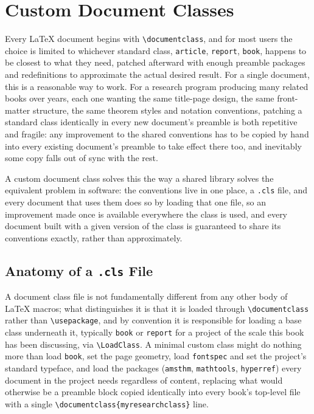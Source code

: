 \hypertarget{chapter-16-custom-document-classes}{%
\chapter{Custom Document Classes}\label{chapter-16-custom-document-classes}}

Every LaTeX document begins with \texttt{\textbackslash{}documentclass}, and for most users the choice is limited to whichever standard class, \texttt{article}, \texttt{report}, \texttt{book}, happens to be closest to what they need, patched afterward with enough preamble packages and redefinitions to approximate the actual desired result. For a single document, this is a reasonable way to work. For a research program producing many related books over years, each one wanting the same title-page design, the same front-matter structure, the same theorem styles and notation conventions, patching a standard class identically in every new document's preamble is both repetitive and fragile: any improvement to the shared conventions has to be copied by hand into every existing document's preamble to take effect there too, and inevitably some copy falls out of sync with the rest.

A custom document class solves this the way a shared library solves the equivalent problem in software: the conventions live in one place, a \texttt{.cls} file, and every document that uses them does so by loading that one file, so an improvement made once is available everywhere the class is used, and every document built with a given version of the class is guaranteed to share its conventions exactly, rather than approximately.

\hypertarget{anatomy-of-a-.cls-file}{%
\section{\texorpdfstring{Anatomy of a \texttt{.cls} File}{Anatomy of a .cls File}}\label{anatomy-of-a-.cls-file}}

A document class file is not fundamentally different from any other body of LaTeX macros; what distinguishes it is that it is loaded through \texttt{\textbackslash{}documentclass} rather than \texttt{\textbackslash{}usepackage}, and by convention it is responsible for loading a base class underneath it, typically \texttt{book} or \texttt{report} for a project of the scale this book has been discussing, via \texttt{\textbackslash{}LoadClass}. A minimal custom class might do nothing more than load \texttt{book}, set the page geometry, load \texttt{fontspec} and set the project's standard typeface, and load the packages (\texttt{amsthm}, \texttt{mathtools}, \texttt{hyperref}) every document in the project needs regardless of content, replacing what would otherwise be a preamble block copied identically into every book's top-level file with a single \texttt{\textbackslash{}documentclass\{myresearchclass\}} line.

